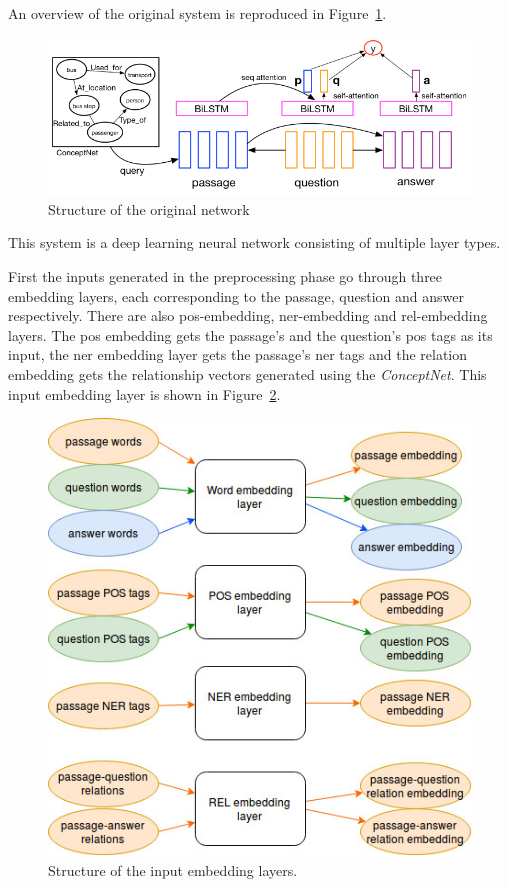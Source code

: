 An overview of the original system is reproduced in Figure~\ref{fig:dnn}.
\begin{figure}[h!]
	\centering
	\includegraphics[scale=0.5]{TriAN.jpg}
	\caption{Structure of the original network \cite{Wang:2018}}
	\label{fig:dnn}
\end{figure}
This system is a deep learning neural network consisting of multiple layer types.


First the inputs generated in the preprocessing phase go through three embedding layers, each corresponding to the passage, question and answer respectively. There are also pos-embedding, ner-embedding and rel-embedding layers. The pos embedding gets the passage's and the question's pos tags as its input, the ner embedding layer gets the passage's ner tags and the relation embedding gets the relationship vectors generated using the \textit{ConceptNet}. This input embedding layer is shown in Figure~\ref{fig:embedding}.
\begin{figure}[h!]
	\centering
	\includegraphics[scale=0.5]{TriAN_embeddings.jpg}
	\caption{Structure of the input embedding layers.}
	\label{fig:embedding}
\end{figure}

